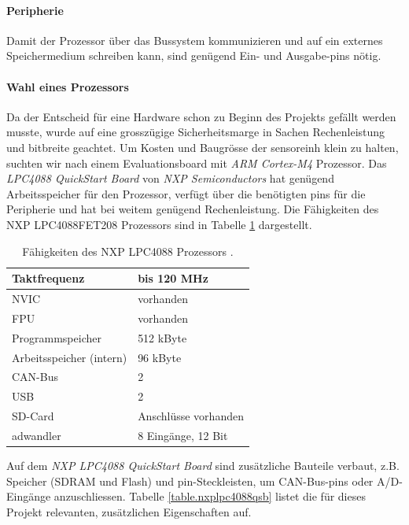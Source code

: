 \paragraph{Peripherie} Damit der Prozessor über das Bussystem kommunizieren und auf ein externes Speichermedium schreiben kann, sind genügend Ein- und Ausgabe-\glspl{pin} nötig.

\paragraph{Wahl eines Prozessors} Da der Entscheid für eine Hardware schon zu Beginn des Projekts gefällt werden musste, wurde auf eine grosszügige Sicherheitsmarge in Sachen Rechenleistung und \gls{bitbreite} geachtet.  Um Kosten und Baugrösse der \gls{sensoreinh} klein zu halten, suchten wir nach einem Evaluationsboard mit \emph{ARM Cortex-M4} Prozessor. Das \emph{LPC4088 QuickStart Board} von \emph{NXP Semiconductors} hat genügend Arbeitsspeicher für den Prozessor, verfügt über die benötigten \glspl{pin} für die Peripherie und hat bei weitem genügend Rechenleistung. Die Fähigkeiten des NXP LPC4088FET208 Prozessors sind in Tabelle \ref{table.lpc4088} dargestellt. 

\begin{table}
\begin{center}
\begin{tabular}{|l|l|}
\hline
Taktfrequenz & bis 120 MHz \\
\hline
NVIC & vorhanden \\
\hline
FPU & vorhanden \\
\hline
Programmspeicher & 512 kByte \\
\hline
Arbeitsspeicher (intern) & 96 kByte \\
\hline
CAN-Bus & 2 \\
\hline
USB & 2 \\
\hline
SD-Card & Anschlüsse vorhanden \\
\hline
\gls{adwandler} & 8 Eingänge, 12 Bit \\
\hline
\end{tabular}
\caption{Fähigkeiten des NXP LPC4088 Prozessors \cite{nxplpc4088}.}
\label{table.lpc4088}
\end{center}
\end{table}

Auf dem \emph{NXP LPC4088 QuickStart Board} sind zusätzliche Bauteile verbaut, z.B. Speicher (SDRAM und Flash) und \gls{pin}-Steckleisten, um CAN-Bus-\glspl{pin} oder A/D-Eingänge anzuschliessen. Tabelle \ref{table.nxplpc4088qsb} listet die für dieses Projekt relevanten, zusätzlichen Eigenschaften auf.

